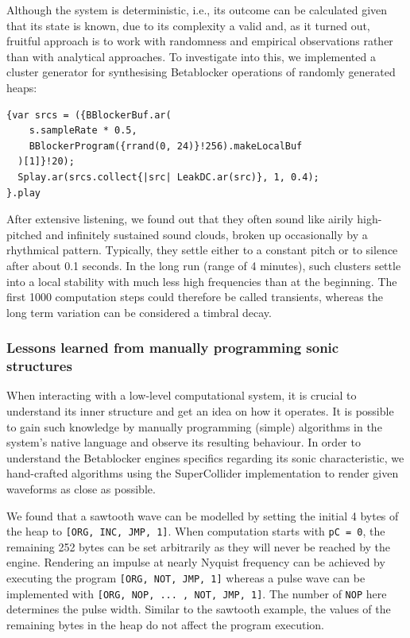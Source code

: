 \documentclass[letterpaper, 12pt]{article}
\begin{document}
Although the system is deterministic, i.e., its outcome can be calculated given that its state is known, due to its complexity a valid and, as it turned out, fruitful approach is to work with randomness and empirical observations rather than with analytical approaches.
To investigate into this, we implemented a cluster generator for synthesising Betablocker operations of randomly generated heaps:
\begin{Verbatim}[fontfamily=courier, xleftmargin=\parindent]
{var srcs = ({BBlockerBuf.ar(
    s.sampleRate * 0.5,
    BBlockerProgram({rrand(0, 24)}!256).makeLocalBuf
  )[1]}!20);
  Splay.ar(srcs.collect{|src| LeakDC.ar(src)}, 1, 0.4);
}.play
\end{Verbatim}
After extensive listening, we found out that they often sound like airily high-pitched and infinitely sustained sound clouds, broken up occasionally by a rhythmical pattern.
Typically, they settle either to a constant pitch or to silence after about 0.1 seconds.
In the long run (range of 4 minutes), such clusters settle into a local stability with much less high frequencies than at the beginning.
The first 1000 computation steps could therefore be called transients, whereas the long term variation can be considered a timbral decay.
\parskip 18pt

\subsubsection{Lessons learned from manually programming sonic structures}
\label{sub:manual_programming_sonic_structures}

When interacting with a low-level computational system, it is crucial to understand its inner structure and get an idea on how it operates.
It is possible to gain such knowledge by manually programming (simple) algorithms in the system's native language and observe its resulting behaviour.
In order to understand the Betablocker engines specifics regarding its sonic characteristic, we hand-crafted algorithms using the SuperCollider implementation to render given waveforms as close as possible.

We found that a sawtooth wave can be modelled by setting the initial 4 bytes of the heap to
\texttt{[ORG, INC, JMP, 1]}.
When computation starts with \texttt{pC = 0}, the remaining 252 bytes can be set arbitrarily as they will never be reached by the engine.
Rendering an impulse at nearly Nyquist frequency can be achieved by executing the program \texttt{[ORG, NOT, JMP, 1]} whereas a pulse wave can be implemented with \texttt{[ORG, NOP, ... , NOT, JMP, 1]}.
The number of \texttt{NOP} here determines the pulse width.
Similar to the sawtooth example, the values of the remaining bytes in the heap do not affect the program execution.
\end{document}
